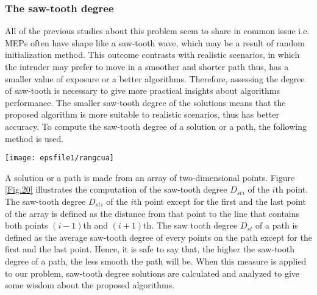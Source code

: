 \documentclass[final]{elsarticle}
\begin{document}
\subsubsection{The saw-tooth degree}
All of the previous studies about this problem seem to share in common issue i.e. MEPs often have shape like a saw-tooth wave, which may be a result of random initialization method. This outcome contrasts with realistic scenarios, in which the intruder may prefer to move in a smoother and shorter path thus, has a smaller value of exposure or a better algorithms. Therefore, assessing the degree of saw-tooth is necessary to give more practical insights about algorithms performance. The smaller saw-tooth degree of the solutions means that the proposed algorithm is more suitable to realistic scenarios, thus has better accuracy. To compute the saw-tooth degree of a solution or a path, the following method is used.
\begin{figure*}[h]
	\texttt{[image: epsfile1/rangcua]}
	\centering	
	\caption{The computation of the saw-tooth degree}
	\label{Fig.20}       %
\end{figure*}
A solution or a path is made from an array of two-dimensional points. Figure \ref{Fig.20} illustrates the computation of the saw-tooth degree \textit{$ D_{st} $$_i$}  of the $ i $th point. The saw-tooth degree \textit{$ D_{st} $$_i$} of the $ i $th point except for the first and the last point of the array is defined as the distance from that point to the line that contains both points $ (i-1) $th and $ (i+1) $th. The saw tooth degree \textit{$ D_{st} $} of a path is defined as the average saw-tooth degree of every points on the path except for the first and the last point. Hence, it is safe to say that, the higher the saw-tooth degree of a path, the less smooth the path will be. When this measure is applied to our problem, saw-tooth degree solutions are calculated and analyzed to give some wisdom about the proposed algorithms.
\end{document}
